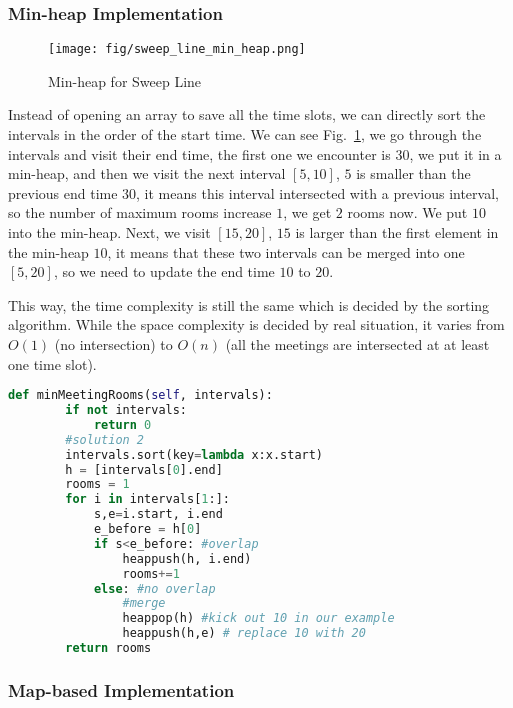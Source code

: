 \documentclass[../main.tex]{subfiles}
\begin{document}
\subsubsection{Min-heap Implementation}
\begin{figure}[h]
    \centering
    \texttt{[image: fig/sweep\_line\_min\_heap.png]}
    \caption{Min-heap for Sweep Line}
    \label{fig:min_heap_sl}
\end{figure}
Instead of opening an array to save all the time slots, we can directly sort the intervals in the order of the start time. We can see Fig.~\ref{fig:min_heap_sl}, we go through the intervals and visit their end time, the first one we encounter is $30$, we put it in a min-heap, and then we visit the next interval $[5, 10]$, $5$ is smaller than the previous end time $30$, it means this interval intersected with a previous interval, so the number of maximum rooms increase $1$, we get $2$ rooms now. We put $10$ into the min-heap. Next, we visit $[15, 20]$, $15$ is larger than the first element in the min-heap $10$, it means that these two intervals can be merged into one $[5, 20]$, so we need to update the end time $10$ to $20$. 

This way, the time complexity is still the same which is decided by the sorting algorithm. While the space complexity is decided by real situation, it varies from $O(1)$ (no intersection) to $O(n)$ (all the meetings are intersected at at least one time slot).  
\begin{lstlisting}[language=Python]
def minMeetingRooms(self, intervals):
        if not intervals:
            return 0
        #solution 2
        intervals.sort(key=lambda x:x.start)
        h = [intervals[0].end]
        rooms = 1
        for i in intervals[1:]:
            s,e=i.start, i.end
            e_before = h[0]
            if s<e_before: #overlap
                heappush(h, i.end)
                rooms+=1
            else: #no overlap
                #merge
                heappop(h) #kick out 10 in our example
                heappush(h,e) # replace 10 with 20
        return rooms
\end{lstlisting}
\subsubsection{Map-based Implementation}
\end{document}
